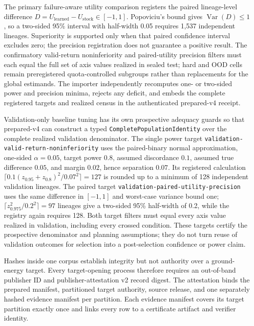 The primary failure-aware utility comparison registers the paired lineage-level difference $D=U_{\mathrm{learned}}-U_{\mathrm{stock}}\in[-1,1]$. Popoviciu's bound gives $\operatorname{Var}(D)\leq1$, so a two-sided 95\% interval with half-width 0.05 requires 1,537 independent lineages. Superiority is supported only when that paired confidence interval excludes zero; the precision registration does not guarantee a positive result. The confirmatory valid-return noninferiority and paired-utility precision filters must each equal the full set of axis values realized in sealed test; hard and OOD cells remain preregistered quota-controlled subgroups rather than replacements for the global estimands. The importer independently recomputes one- or two-sided power and precision minima, rejects any deficit, and embeds the complete registered targets and realized census in the authenticated prepared-v4 receipt.

Validation-only baseline tuning has its own prospective adequacy guards so that prepared-v4 can construct a typed \texttt{CompletePopulationIdentity} over the complete realized validation denominator. The single power target \texttt{validation-valid-return-noninferiority} uses the paired-binary normal approximation, one-sided $\alpha=0.05$, target power $0.8$, assumed discordance $0.1$, assumed true difference $0.05$, and margin $0.02$, hence separation $0.07$. Its registered calculation $\lceil0.1(z_{0.95}+z_{0.8})^2/0.07^2\rceil=127$ is rounded up to a minimum of 128 independent validation lineages. The paired target \texttt{validation-paired-utility-precision} uses the same difference in $[-1,1]$ and worst-case variance bound one; $\lceil z_{0.975}^2/0.2^2\rceil=97$ lineages give a two-sided 95\% half-width of 0.2, while the registry again requires 128. Both target filters must equal every axis value realized in validation, including every crossed condition. These targets certify the prospective denominator and planning assumptions; they do not turn reuse of validation outcomes for selection into a post-selection confidence or power claim.

Hashes inside one corpus establish integrity but not authority over a ground-energy target. Every target-opening process therefore requires an out-of-band publisher ID and publisher-attestation v2 record digest. The attestation binds the prepared manifest, partitioned target authority, source release, and one separately hashed evidence manifest per partition. Each evidence manifest covers its target partition exactly once and links every row to a certificate artifact and verifier identity.

